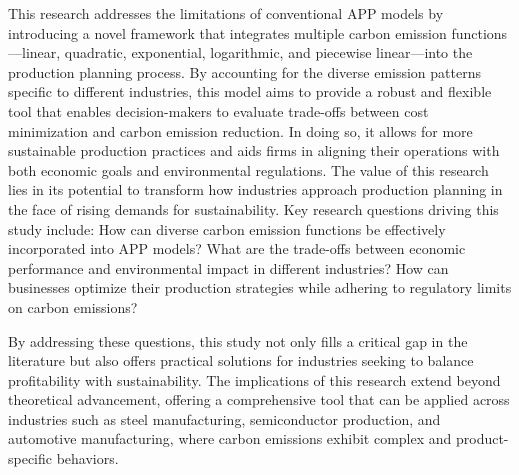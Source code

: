 \documentclass[final,3p,times,review,authoryear]{elsarticle}
\begin{document}



This research addresses the limitations of conventional APP models by introducing a novel framework that integrates multiple carbon emission functions—linear, quadratic, exponential, logarithmic, and piecewise linear—into the production planning process. By accounting for the diverse emission patterns specific to different industries, this model aims to provide a robust and flexible tool that enables decision-makers to evaluate trade-offs between cost minimization and carbon emission reduction. In doing so, it allows for more sustainable production practices and aids firms in aligning their operations with both economic goals and environmental regulations. The value of this research lies in its potential to transform how industries approach production planning in the face of rising demands for sustainability. Key research questions driving this study include: How can diverse carbon emission functions be effectively incorporated into APP models? What are the trade-offs between economic performance and environmental impact in different industries? How can businesses optimize their production strategies while adhering to regulatory limits on carbon emissions?

By addressing these questions, this study not only fills a critical gap in the literature but also offers practical solutions for industries seeking to balance profitability with sustainability. The implications of this research extend beyond theoretical advancement, offering a comprehensive tool that can be applied across industries such as steel manufacturing, semiconductor production, and automotive manufacturing, where carbon emissions exhibit complex and product-specific behaviors.


\end{document}
